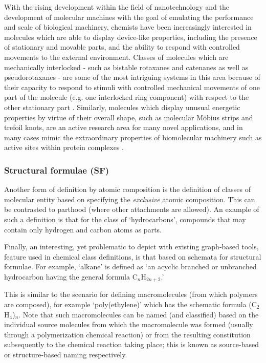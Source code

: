\documentclass[10pt]{bmc_article}
\newenvironment{bmcformat}{\baselineskip20pt\sloppy\setboolean{publ}{false}}{\baselineskip20pt\sloppy}
\begin{document}
\begin{bmcformat}
With the rising development within the field of nanotechnology and the development of molecular machines with the goal of emulating the performance and scale of biological machinery, chemists have been increasingly interested in molecules which are able to display device-like properties, including the presence of stationary and movable parts, and the ability to respond with controlled movements to the external environment. Classes of molecules which are mechanically interlocked  - such as bistable rotaxanes and catenanes as well as pseudorotaxanes - are some of the most intriguing systems in this area because of their capacity to respond to stimuli with controlled mechanical movements of one part of the molecule (e.g. one interlocked ring component) with respect to the other stationary part \cite{stoddart2011}.  Similarly, molecules which display unusual energetic properties by virtue of their overall shape, such as molecular M\"{o}bius strips and trefoil knots, are an active research area for many novel applications, and in many cases mimic the extraordinary properties of biomolecular machinery such as active sites within protein complexes \cite{rzepa2009a,rzepa2009b}.  



\subsubsection*{Structural formulae (SF)}
\label{sec:molformula}

Another form of definition by atomic composition is the definition of classes of molecular entity based on specifying the \textit{exclusive} atomic composition.  This can be contrasted to parthood (where other attachments are allowed).  An example of such a definition is that for the class of `hydrocarbons', compounds that may contain only hydrogen and carbon atoms as parts. 

Finally, an interesting, yet problematic to depict with existing graph-based tools, feature used in chemical class definitions, is that based on schemata for structural formulae.  For example, `alkane' is defined as `an acyclic branched or unbranched hydrocarbon having the general formula C$_{n}$H$_{2n+2}$.' 

This is similar to the scenario for defining macromolecules (from which polymers are composed), for example `poly(ethylene)' which has the schematic formula (C$_2$H$_4$)$_{n}$. Note that such macromolecules can be named (and classified) based on the individual source molecules from which the macromolecule was formed (usually through a polymerization chemical reaction) or from the resulting constitution subsequently to the chemical reaction taking place; this is known as source-based or structure-based naming respectively.  %


\end{bmcformat}
\end{document}
